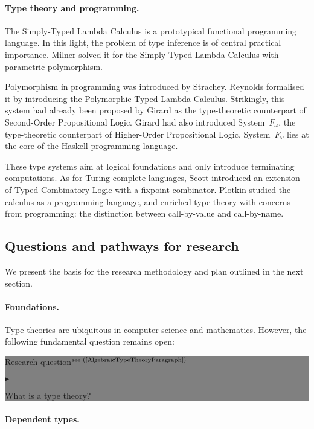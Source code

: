 \documentclass[11pt,twocolumn]{article}
\newenvironment{btritemize}
  {\begin{list}{\btr}
  {\setlength{\topsep}{2pt}
   \setlength{\partopsep}{2pt}
   \setlength{\itemsep}{2.5pt}
   \setlength{\parsep}{2.5pt}
   \setlength{\leftmargin}{1em}
   \setlength{\labelwidth}{.5em}}}
  {\end{list}}
\newcommand{\mytextsf}[1]{\textsf{\small #1}}
\newcommand{\SystemFomega}{\mbox{System~$F_\omega$}}
\newcommand{\btr}{$\blacktriangleright$}
\newcommand{\reqpsize}{8.113395cm}%
\newcommand{\req}[2]{\begin{center}\colorbox{grey}{\begin{minipage}{\reqpsize} 
  \mytextsf{Research question}\hfill$^{\mbox{\scriptsize see (#1) }}$\\[-5.5mm]
  \begin{btritemize}
  \item #2
  \end{btritemize}
\end{minipage}}\end{center}}
\begin{document}
\paragraph*{Type theory and programming.}

The Simply-Typed Lambda Calculus is a prototypical functional programming
language.  In this light, the problem of type inference is of central
practical importance.  Milner %
solved it for the Simply-Typed Lambda Calculus with parametric polymorphism.  
 
Polymorphism in programming was introduced by Strachey. %
Reynolds %
formalised it by introducing the Polymorphic Typed Lambda Calculus.
Strikingly, this system had already been proposed by
Girard %
as the type-theoretic counterpart of Second-Order Propositional Logic.  Girard
had also introduced {\SystemFomega}, the type-theoretic counterpart of
Higher-Order Propositional Logic.  {\SystemFomega} lies at the core of the
Haskell programming language. 

These type systems aim at logical foundations and only introduce terminating
computations.  As for Turing complete languages, Scott %
introduced an extension of Typed Combinatory Logic with a fixpoint combinator. 
Plotkin %
studied the calculus as a programming language, and enriched type theory with
concerns from programming: the distinction between call-by-value and
call-by-name. %

\subsection{Questions and pathways for research}

We present the basis for the research methodology and plan outlined in the
next section.

\paragraph*{Foundations.}

Type theories are ubiquitous in computer science and mathematics.  However,
the following fundamental question remains open:
\req{\ref{AlgebraicTypeTheoryParagraph}}
{What is a type theory?}

\paragraph*{Dependent types.}
\end{document}
